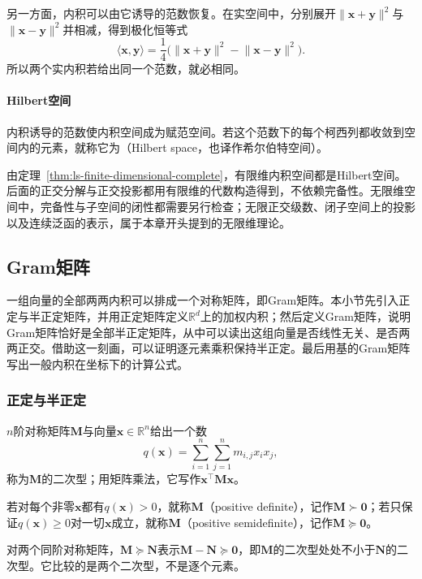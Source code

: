 另一方面，内积可以由它诱导的范数恢复。在实空间中，分别展开$\lVert\bm x+\bm y\rVert^2$与$\lVert\bm x-\bm y\rVert^2$并相减，得到极化恒等式
\[
 \langle\bm x,\bm y\rangle=\frac14\bigl(\lVert\bm x+\bm y\rVert^2-\lVert\bm x-\bm y\rVert^2\bigr).
\]
所以两个实内积若给出同一个范数，就必相同。

\paragraph{Hilbert空间}
\label{sec:ls-hilbert-spaces}
内积诱导的范数使内积空间成为赋范空间。若这个范数下的每个柯西列都收敛到空间内的元素，就称它为（Hilbert space，也译作希尔伯特空间）。

由定理~\ref{thm:ls-finite-dimensional-complete}，有限维内积空间都是Hilbert空间。后面的正交分解与正交投影都用有限维的代数构造得到，不依赖完备性。无限维空间中，完备性与子空间的闭性都需要另行检查；无限正交级数、闭子空间上的投影以及连续泛函的表示，属于本章开头提到的无限维理论。

\subsection{Gram矩阵}
\label{sec:ls-gram-psd}

一组向量的全部两两内积可以排成一个对称矩阵，即Gram矩阵。本小节先引入正定与半正定矩阵，并用正定矩阵定义$\mathbb R^d$上的加权内积；然后定义Gram矩阵，说明Gram矩阵恰好是全部半正定矩阵，从中可以读出这组向量是否线性无关、是否两两正交。借助这一刻画，可以证明逐元素乘积保持半正定。最后用基的Gram矩阵写出一般内积在坐标下的计算公式。

\subsubsection{正定与半正定}
\label{sec:ls-positive-definite}
$n$阶对称矩阵$\bm M$与向量$\bm x\in\mathbb R^n$给出一个数
\[
 q(\bm x)=\sum_{i=1}^n\sum_{j=1}^n m_{i,j}x_ix_j,
\]
称为$\bm M$的二次型；用矩阵乘法，它写作$\bm x^\top\bm M\bm x$。

若对每个非零$\bm x$都有$q(\bm x)>0$，就称$\bm M$（positive definite），记作$\bm M\succ\bm0$；若只保证$q(\bm x)\geq0$对一切$\bm x$成立，就称$\bm M$（positive semidefinite），记作$\bm M\succeq\bm0$。

对两个同阶对称矩阵，$\bm M\succeq\bm N$表示$\bm M-\bm N\succeq\bm0$，即$\bm M$的二次型处处不小于$\bm N$的二次型。它比较的是两个二次型，不是逐个元素。

